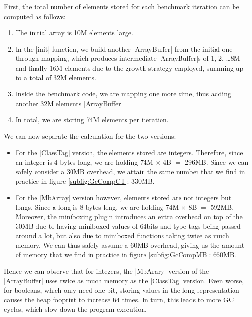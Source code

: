 First, the total number of elements stored for each benchmark iteration can be computed as follows:
\begin{enumerate}
  \item The initial array is 10M elements large.
  \item In the |init| function, we build another |ArrayBuffer| from the initial one through mapping, which produces intermediate |ArrayBuffer|s of 1, 2, \ldots 8M and finally 16M elements due to the growth strategy employed, summing up to a total of 32M elements.
  \item Inside the benchmark code, we are mapping one more time, thus adding another 32M elements |ArrayBuffer|
  \item In total, we are storing 74M elements per iteration.
\end{enumerate}

We can now separate the calculation for the two versions:
\begin{itemize}
	\item For the |ClassTag| version, the elements stored are integers. Therefore, since an integer is 4 bytes long, we are holding 74M $\times$ 4B $=$ 296MB. Since we can safely consider a 30MB overhead, we attain the same number that we find in practice in figure \ref{subfig:GcCompCT}: 330MB.
	\item For the |MbArray| version however, elements stored are not integers but longs. Since a long is 8 bytes long, we are holding 74M $\times$ 8B $=$ 592MB. Moreover, the miniboxing plugin introduces an extra overhead on top of the 30MB due to having miniboxed values of 64bits and type tags being passed around a lot, but also due to miniboxed functions taking twice as much memory. We can thus safely assume a 60MB overhead, giving us the amount of memory that we find in practice in figure \ref{subfig:GcCompMB}: 660MB. 
\end{itemize}

Hence we can observe that for integers, the |MbArary| version of the |ArrayBuffer| uses twice as much memory as the |ClassTag| version. Even worse, for booleans, which only need one bit, storing values in the long representation causes the heap fooprint to increase 64 times. In turn, this leads to more GC cycles, which slow down the program execution.


